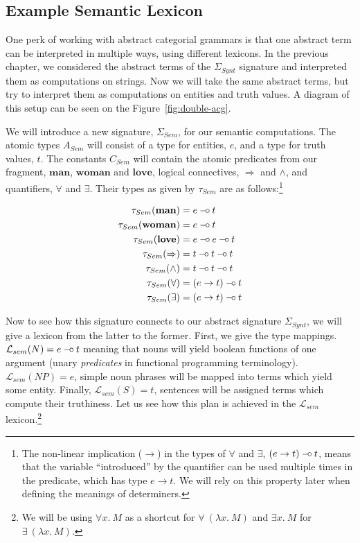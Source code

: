 \subsection{Example Semantic Lexicon}
\label{ssec:acg-sem}

One perk of working with abstract categorial grammars is that one
abstract term can be interpreted in multiple ways, using different
lexicons. In the previous chapter, we considered the abstract terms of
the $\Sigma_{Synt}$ signature and interpreted them as computations on
strings. Now we will take the same abstract terms, but try to interpret
them as computations on entities and truth values. A diagram of this
setup can be seen on the Figure~\ref{fig:double-acg}.

We will introduce a new signature, $\Sigma_{Sem}$, for our semantic
computations. The atomic types $A_{Sem}$ will consist of a type for
entities, $e$, and a type for truth values, $t$. The constants $C_{Sem}$
will contain the atomic predicates from our fragment, $\textbf{man}$,
$\textbf{woman}$ and $\textbf{love}$, logical connectives, $\Rightarrow$
and $\land$, and quantifiers, $\forall$ and $\exists$. Their types as
given by $\tau_{Sem}$ are as follows:\footnote{The non-linear
  implication ($\to$) in the types of $\forall$ and $\exists$, $(e \to
  t) \mathbin{{-}\mkern-3.5mu{\circ}} t$, means that the variable ``introduced'' by the quantifier
  can be used multiple times in the predicate, which has type $e \to
  t$. We will rely on this property later when defining the meanings of
  determiners.}

\begin{align*}
\tau_{Sem}(\textbf{man}) &= e \mathbin{{-}\mkern-3.5mu{\circ}} t \\
\tau_{Sem}(\textbf{woman}) &= e \mathbin{{-}\mkern-3.5mu{\circ}} t \\
\tau_{Sem}(\textbf{love}) &= e \mathbin{{-}\mkern-3.5mu{\circ}} e \mathbin{{-}\mkern-3.5mu{\circ}} t \\
\tau_{Sem}(\Rightarrow) &= t \mathbin{{-}\mkern-3.5mu{\circ}} t \mathbin{{-}\mkern-3.5mu{\circ}} t \\
\tau_{Sem}(\land) &= t \mathbin{{-}\mkern-3.5mu{\circ}} t \mathbin{{-}\mkern-3.5mu{\circ}} t \\
\tau_{Sem}(\forall) &= (e \to t) \mathbin{{-}\mkern-3.5mu{\circ}} t \\
\tau_{Sem}(\exists) &= (e \to t) \mathbin{{-}\mkern-3.5mu{\circ}} t
\end{align*}

Now to see how this signature connects to our abstract signature
$\Sigma_{Synt}$, we will give a lexicon from the latter to the
former. First, we give the type mappings. $\mathcal{L}_{sem}(N) = e
\mathbin{{-}\mkern-3.5mu{\circ}} t$ meaning that nouns will yield boolean functions of one argument
(unary \emph{predicates} in functional programming
terminology). $\mathcal{L}_{sem}(NP) = e$, simple noun phrases will be
mapped into terms which yield some entity. Finally,
$\mathcal{L}_{sem}(S) = t$, sentences will be assigned terms which
compute their truthiness. Let us see how this plan is achieved in the
$\mathcal{L}_{sem}$ lexicon.\footnote{We will be using $\forall x.\ M$
  as a shortcut for $\forall\ (\lambda x.\ M)$ and $\exists x.\ M$ for
  $\exists\ (\lambda x.\ M)$.}


